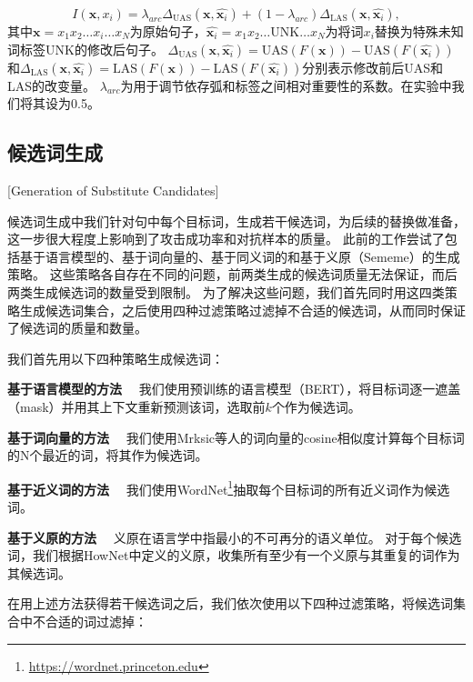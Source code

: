 \begin{equation}
	\label{eq:word-importance}
	I(\mathbf{x},x_i) = \lambda_{arc}\Delta_\text{UAS}(\mathbf{x},\hat{\mathbf{x}_i}) + (1-\lambda_{arc})\Delta_\text{LAS}(\mathbf{x},\hat{\mathbf{x}_i}),
\end{equation}
其中$\mathbf{x} = x_1x_2\dots x_i\dots x_N$为原始句子，$\hat{\mathbf{x}_i} = x_1x_2\dots \text{UNK}\dots x_N$为将词$x_i$替换为特殊未知词标签UNK的修改后句子。
$\Delta_\text{UAS}(\mathbf{x},\hat{\mathbf{x}_i}) = \text{UAS}(F(\mathbf{x})) - \text{UAS}(F(\hat{\mathbf{x}_i})) $和$\Delta_\text{LAS}(\mathbf{x},\hat{\mathbf{x}_i}) = \text{LAS}(F(\mathbf{x})) - \text{LAS}(F(\hat{\mathbf{x}_i}))$分别表示修改前后UAS和LAS的改变量。
$\lambda_{arc}$为用于调节依存弧和标签之间相对重要性的系数。在实验中我们将其设为0.5。


\subsection{候选词生成}[Generation of Substitute Candidates]
\label{sec:gen-cand}

候选词生成中我们针对句中每个目标词，生成若干候选词，为后续的替换做准备，这一步很大程度上影响到了攻击成功率和对抗样本的质量。
此前的工作尝试了包括基于语言模型的\cite{zheng2020evaluating}、基于词向量的\cite{alzantot2018generating}、基于同义词的\cite{ren2019generating}和基于义原（Sememe）的\cite{zang2020word}生成策略。
这些策略各自存在不同的问题，前两类生成的候选词质量无法保证，而后两类生成候选词的数量受到限制。
为了解决这些问题，我们首先同时用这四类策略生成候选词集合，之后使用四种过滤策略过滤掉不合适的候选词，从而同时保证了候选词的质量和数量。

我们首先用以下四种策略生成候选词：

\textbf{基于语言模型的方法} \ \ 我们使用预训练的语言模型（BERT），将目标词逐一遮盖（mask）并用其上下文重新预测该词，选取前$k$个作为候选词。

\textbf{基于词向量的方法} \ \ 我们使用Mrksic等人的词向量\cite{mrksic2016counter}的cosine相似度计算每个目标词的N个最近的词，将其作为候选词。

\textbf{基于近义词的方法} \ \ 我们使用WordNet\footnote{\url{https://wordnet.princeton.edu}}抽取每个目标词的所有近义词作为候选词。

\textbf{基于义原的方法} \ \ 义原在语言学中指最小的不可再分的语义单位。\cite{dong2006hownet} 对于每个候选词，我们根据HowNet中定义的义原，收集所有至少有一个义原与其重复的词作为其候选词。

在用上述方法获得若干候选词之后，我们依次使用以下四种过滤策略，将候选词集合中不合适的词过滤掉：

